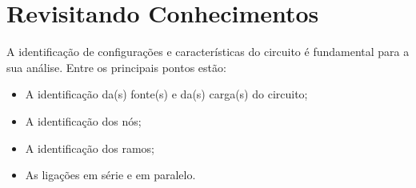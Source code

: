 \section{Revisitando Conhecimentos}
A identificação de configurações e características do circuito é
fundamental para a sua análise.
Entre os principais pontos estão:

\begin{itemize}
  \item A identificação da(s) fonte(s) e da(s) carga(s) do circuito;
  \item A identificação dos nós;
  \item A identificação dos ramos;
  \item As ligações em série e em paralelo.
\end{itemize}

